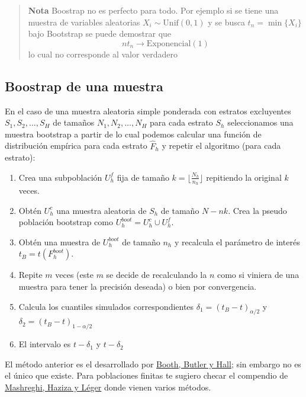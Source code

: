 \documentclass[
]{book}
\providecommand{\tightlist}{%
  \setlength{\itemsep}{0pt}\setlength{\parskip}{0pt}}
\begin{document}
\begin{quote}
\textbf{Nota} Boostrap no es perfecto para todo. Por ejemplo si se tiene una muestra de variables aleatorias \(X_i \sim \text{Unif}(0,1)\) y se busca \(t_n = \min \{ X_i \}\) bajo Bootstrap se puede demostrar que
\[
n t_n \to \text{Exponencial}(1)
\]
lo cual no corresponde al valor verdadero
\end{quote}

\hypertarget{boostrap-de-una-muestra}{%
\subsection{Boostrap de una muestra}\label{boostrap-de-una-muestra}}

En el caso de una muestra aleatoria simple ponderada con estratos excluyentes \(S_1, S_2, \dots, S_{H}\) de tamaños \(N_1, N_2, \dots, N_H\) para cada estrato \(S_h\) seleccionamos una muestra bootstrap a partir de lo cual podemos calcular una función de distribución empírica para cada estrato \(\hat{F}_h\) y repetir el algoritmo (para cada estrato):

\begin{enumerate}
\def\labelenumi{\arabic{enumi}.}
\tightlist
\item
  Crea una subpoblación \(U^f_h\) fija de tamaño \(k = \Big\lfloor \frac{N_h}{n_h} \Big\rfloor\) repitiendo la original \(k\) veces.
\item
  Obtén \(U^c_h\) una muestra aleatoria de \(S_h\) de tamaño \(N - nk\). Crea la pseudo población bootstrap como \(U^{boot}_h = U^c_h \cup U^f_h\).
\item
  Obtén una muestra de \(U^{boot}_h\) de tamaño \(n_h\) y recalcula el parámetro de interés \(t_B = t(F_h^{boot})\).
\item
  Repite \(m\) veces (este \(m\) se decide de recalculando la \(n\) como si viniera de una muestra para tener la precisión deseada) o bien por convergencia.
\item
  Calcula los cuantiles simulados correspondientes \(\delta_1 = (t_B - t)_{\alpha/2}\) y \(\delta_2 = (t_B - t)_{1 - \alpha/2}\)
\item
  El intervalo es \(t - \delta_1\) y \(t - \delta_2\)
\end{enumerate}

El método anterior es el desarrollado por \href{http://www.jstor.org/stable/2290991?origin=JSTOR-pdf}{Booth, Butler y Hall}; sin embargo no es el único que existe. Para poblaciones finitas te sugiero checar el compendio de \href{https://projecteuclid.org/euclid.ssu}{Mashreghi, Haziza y Léger} donde vienen varios métodos.
\end{document}
